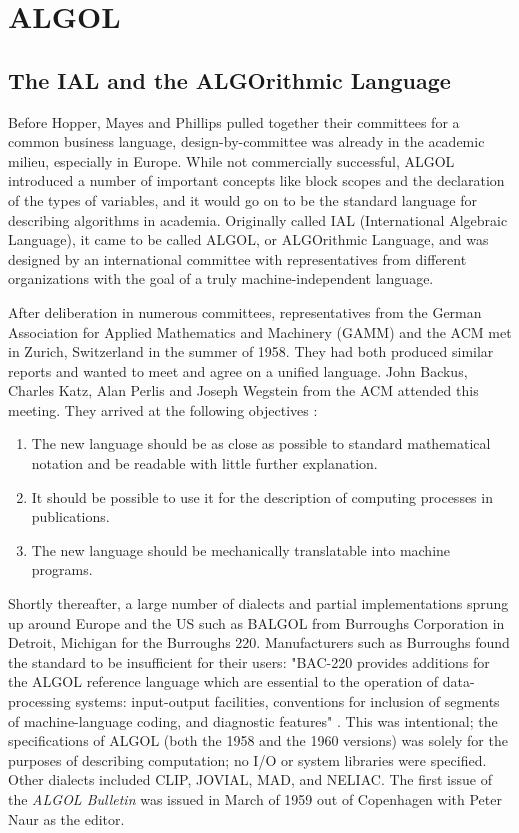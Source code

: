 \section{ALGOL}

\subsection{The IAL and the ALGOrithmic Language}

Before Hopper, Mayes and Phillips pulled together their committees for a common
business language, design-by-committee was already in the academic milieu,
especially in Europe.
While not commercially successful, ALGOL introduced a number of important concepts
like block scopes and the declaration of the types of variables, and it would
go on to be the standard language for describing algorithms in academia.
Originally called IAL (International Algebraic Language), it came to be called
ALGOL, or ALGOrithmic Language, and was designed by an international committee
with representatives from different organizations with the goal of a truly
machine-independent language.

After deliberation in numerous committees, representatives from the German
Association for Applied Mathematics and Machinery (GAMM) and the ACM met in
Zurich, Switzerland in the summer of 1958. They had both produced similar
reports and wanted to meet and agree on a unified language.
John Backus, Charles Katz, Alan Perlis and Joseph Wegstein from the ACM attended this meeting.
They arrived at the following objectives
\cite{perlis_samelson_1958_preliminary_report_ial}:

\begin{enumerate}
	\item The new language should be as close as possible to standard mathematical
	      notation and be readable with little further explanation.
	\item It should be possible to use it for the description of computing processes in publications.
	\item The new language should be mechanically translatable into machine programs.
\end{enumerate}

Shortly thereafter, a large number of dialects and partial implementations sprung up around Europe
and the US such as BALGOL from Burroughs Corporation in Detroit, Michigan for the Burroughs 220.
Manufacturers such as Burroughs found the standard to be insufficient for their users:
"BAC-220 provides additions for the ALGOL reference language which are essential to
the operation of data-processing systems: input-output
facilities, conventions for inclusion of segments of machine-language coding,
and diagnostic features" \cite{burroughs1963bac220}.
This was intentional; the specifications of ALGOL (both the 1958 and the 1960 versions)
was solely for the purposes of
describing computation; no I/O or system libraries were specified.
Other dialects included CLIP, JOVIAL, MAD, and NELIAC.
The first issue of the \textit{ALGOL Bulletin} was issued in March of 1959 out of Copenhagen
with Peter Naur as the editor.


